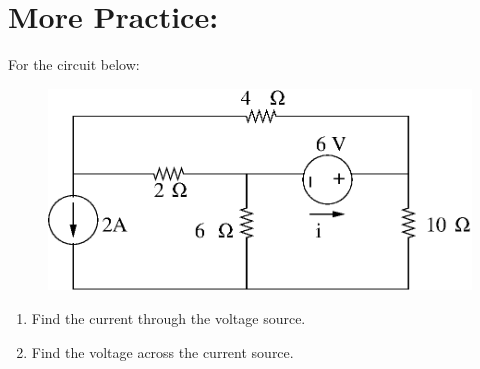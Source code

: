 \section{More Practice:}
For the circuit below:
\begin{figure}[h!]
\begin{minipage}[l]{0.5\linewidth}
\centering
\includegraphics[width=1.0\linewidth]{p5/p5.eps}
\end{minipage}\hfill
\end{figure}
\begin{enumerate}
\item Find the current through the voltage source.
\item Find the voltage across the current source.
\end{enumerate}

